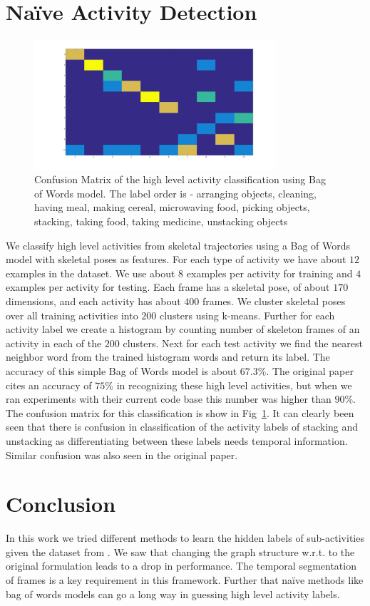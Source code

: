 \documentclass{article} %
\begin{document}
\section{Na{\"i}ve Activity Detection}
\begin{figure}[tpb]
  \centering
    \includegraphics[width=0.8\textwidth]{images/confMat}
    \caption{Confusion Matrix of the high level activity classification using Bag of Words model. The label order is - arranging objects, cleaning, having meal, making cereal, microwaving food, picking objects, stacking, taking food, taking medicine, unstacking objects}
    \label{fig:confmat}
\end{figure}
We classify high level activities from skeletal trajectories using a Bag of Words model \cite{Sivic03} with skeletal poses as features. For each type of activity we have about $12$ examples in the dataset. We use about $8$ examples per activity for training and $4$ examples per activity for testing. Each frame has a skeletal pose, of about $170$ dimensions, and each activity has about $400$ frames. We cluster skeletal poses over all training activities into $200$ clusters using k-means. Further for each activity label we create a histogram by counting number of skeleton frames of an activity in each of the $200$ clusters.  Next for each test activity we find the nearest neighbor word from the trained histogram words and return its label. The accuracy of this simple Bag of Words model is about $67.3\%$.  The original paper cites an accuracy of $75\%$ in recognizing these high level activities, but when we ran experiments with their current code base this number was higher than $90\%$. The confusion matrix for this classification is show in Fig~\ref{fig:confmat}. It can clearly been seen that there is confusion in classification of the activity labels of stacking and unstacking as differentiating between these labels needs temporal information. Similar confusion was also seen in the original paper.

\section{Conclusion}
In this work we tried different methods to learn the hidden labels of sub-activities given the dataset from \cite{koppula2013detectingactivitiesrgbd}. We saw that changing the graph structure w.r.t. to the original formulation leads to a drop in performance. The temporal segmentation of frames is a key requirement in this framework. Further that na{\"i}ve methods like bag of words models can go a long way in guessing high level activity labels.




\end{document}
